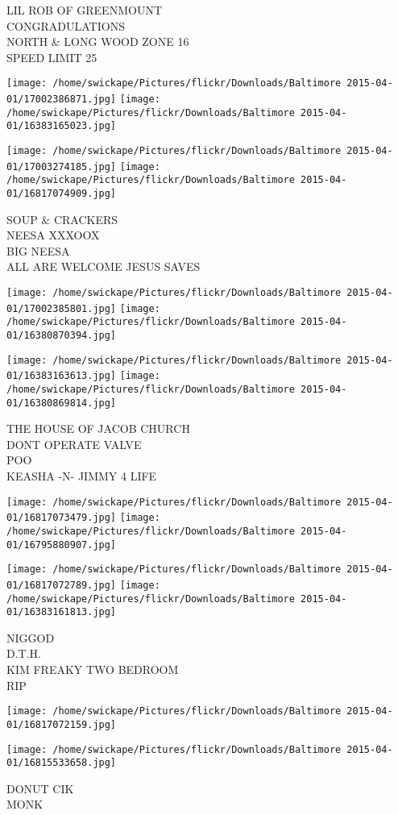 \documentclass[10pt,letterpaper]{article}
\begin{document}
LIL ROB OF GREENMOUNT\\
CONGRADULATIONS\\
NORTH \& LONG WOOD ZONE 16\\
SPEED LIMIT 25
\pagebreak

\texttt{[image: /home/swickape/Pictures/flickr/Downloads/Baltimore 2015-04-01/17002386871.jpg]}
\texttt{[image: /home/swickape/Pictures/flickr/Downloads/Baltimore 2015-04-01/16383165023.jpg]}

\texttt{[image: /home/swickape/Pictures/flickr/Downloads/Baltimore 2015-04-01/17003274185.jpg]}
\texttt{[image: /home/swickape/Pictures/flickr/Downloads/Baltimore 2015-04-01/16817074909.jpg]}

SOUP \& CRACKERS\\
NEESA XXXOOX\\
BIG NEESA\\
ALL ARE WELCOME JESUS SAVES
\pagebreak

\texttt{[image: /home/swickape/Pictures/flickr/Downloads/Baltimore 2015-04-01/17002385801.jpg]}
\texttt{[image: /home/swickape/Pictures/flickr/Downloads/Baltimore 2015-04-01/16380870394.jpg]}

\texttt{[image: /home/swickape/Pictures/flickr/Downloads/Baltimore 2015-04-01/16383163613.jpg]}
\texttt{[image: /home/swickape/Pictures/flickr/Downloads/Baltimore 2015-04-01/16380869814.jpg]}

THE HOUSE OF JACOB CHURCH\\
DONT OPERATE VALVE\\
POO\\
KEASHA {-}N{-} JIMMY 4 LIFE
\pagebreak

\texttt{[image: /home/swickape/Pictures/flickr/Downloads/Baltimore 2015-04-01/16817073479.jpg]}
\texttt{[image: /home/swickape/Pictures/flickr/Downloads/Baltimore 2015-04-01/16795880907.jpg]}

\texttt{[image: /home/swickape/Pictures/flickr/Downloads/Baltimore 2015-04-01/16817072789.jpg]}
\texttt{[image: /home/swickape/Pictures/flickr/Downloads/Baltimore 2015-04-01/16383161813.jpg]}

NIGGOD\\
D.T.H.\\
KIM FREAKY TWO BEDROOM\\
RIP
\pagebreak

\texttt{[image: /home/swickape/Pictures/flickr/Downloads/Baltimore 2015-04-01/16817072159.jpg]}

\vspace{0.25in}
\texttt{[image: /home/swickape/Pictures/flickr/Downloads/Baltimore 2015-04-01/16815533658.jpg]}

DONUT CIK\\
MONK
\pagebreak
\end{document}

